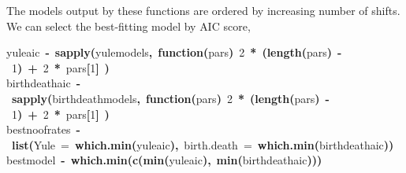 \documentclass[authoryear, preprint]{elsarticle}
\makeatletter
\newcommand{\hlnumber}[1]{\textcolor[rgb]{0,0,0}{#1}}%
\newcommand{\hlfunctioncall}[1]{\textcolor[rgb]{.5,0,.33}{\textbf{#1}}}%
\newcommand{\hlkeyword}[1]{\textbf{#1}}%
\newcommand{\hlargument}[1]{\textcolor[rgb]{.69,.25,.02}{#1}}%
\newcommand{\hlformalargs}[1]{\hlargument{#1}}%
\newcommand{\hlassignement}[1]{\textbf{#1}}%
\newcommand{\hlsymbol}[1]{#1}%
\newcommand{\hlstd}[1]{\textcolor[rgb]{0,0,0}{#1}}%
\newenvironment{kframe}{%
 \def\FrameCommand##1{\hskip\@totalleftmargin \hskip-\fboxsep
 \colorbox{shadecolor}{##1}\hskip-\fboxsep
     \hskip-\linewidth \hskip-\@totalleftmargin \hskip\columnwidth}%
 \MakeFramed {\advance\hsize-\width
   \@totalleftmargin\z@ \linewidth\hsize
   \@setminipage}}%
 {\par\unskip\endMakeFramed}
\newenvironment{knitrout}{}{} %
\makeatother
\begin{document}
The models output by these functions are ordered by increasing number of shifts.  
We can select the best-fitting model by AIC score,
\begin{knitrout}
\color{fgcolor}\begin{kframe}
\begin{flushleft}
\ttfamily\noindent
\hlsymbol{yule\usebox{\hlnormalsizeboxunderscore}aic}{\ }\hlassignement{\usebox{\hlnormalsizeboxlessthan}-}{\ }\hlfunctioncall{sapply}\hlkeyword{(}\hlsymbol{yule\usebox{\hlnormalsizeboxunderscore}models}\hlkeyword{,}{\ }\hlkeyword{function}\hlkeyword{(}\hlformalargs{pars}\hlkeyword{)}{\ }\hlnumber{2}{\ }\hlkeyword{*}{\ }\hlkeyword{(}\hlfunctioncall{length}\hlkeyword{(}\hlsymbol{pars}\hlkeyword{)}{\ }\hlkeyword{-}{\ }\hlnumber{1}\hlkeyword{)}{\ }\hlkeyword{+}{\ }\hlnumber{2}{\ }\hlkeyword{*}{\ }\hlsymbol{pars}\hlkeyword{[}\hlnumber{1}\hlkeyword{]}{\ }\hlkeyword{)}\hspace*{\fill}\\
\hlstd{}\hlsymbol{birth\usebox{\hlnormalsizeboxunderscore}death\usebox{\hlnormalsizeboxunderscore}aic}{\ }\hlassignement{\usebox{\hlnormalsizeboxlessthan}-}{\ }\hlfunctioncall{sapply}\hlkeyword{(}\hlsymbol{birth\usebox{\hlnormalsizeboxunderscore}death\usebox{\hlnormalsizeboxunderscore}models}\hlkeyword{,}{\ }\hlkeyword{function}\hlkeyword{(}\hlformalargs{pars}\hlkeyword{)}{\ }\hlnumber{2}{\ }\hlkeyword{*}{\ }\hlkeyword{(}\hlfunctioncall{length}\hlkeyword{(}\hlsymbol{pars}\hlkeyword{)}{\ }\hlkeyword{-}{\ }\hlnumber{1}\hlkeyword{)}{\ }\hlkeyword{+}{\ }\hlnumber{2}{\ }\hlkeyword{*}{\ }\hlsymbol{pars}\hlkeyword{[}\hlnumber{1}\hlkeyword{]}{\ }\hlkeyword{)}\hspace*{\fill}\\
\hlstd{}\hlsymbol{best\usebox{\hlnormalsizeboxunderscore}no\usebox{\hlnormalsizeboxunderscore}of\usebox{\hlnormalsizeboxunderscore}rates}{\ }\hlassignement{\usebox{\hlnormalsizeboxlessthan}-}{\ }\hlfunctioncall{list}\hlkeyword{(}\hlargument{Yule}{\ }\hlargument{=}{\ }\hlfunctioncall{which.min}\hlkeyword{(}\hlsymbol{yule\usebox{\hlnormalsizeboxunderscore}aic}\hlkeyword{)}\hlkeyword{,}{\ }\hlargument{birth.death}{\ }\hlargument{=}{\ }\hlfunctioncall{which.min}\hlkeyword{(}\hlsymbol{birth\usebox{\hlnormalsizeboxunderscore}death\usebox{\hlnormalsizeboxunderscore}aic}\hlkeyword{)}\hlkeyword{)}\hspace*{\fill}\\
\hlstd{}\hlsymbol{best\usebox{\hlnormalsizeboxunderscore}model}{\ }\hlassignement{\usebox{\hlnormalsizeboxlessthan}-}{\ }\hlfunctioncall{which.min}\hlkeyword{(}\hlfunctioncall{c}\hlkeyword{(}\hlfunctioncall{min}\hlkeyword{(}\hlsymbol{yule\usebox{\hlnormalsizeboxunderscore}aic}\hlkeyword{)}\hlkeyword{,}{\ }\hlfunctioncall{min}\hlkeyword{(}\hlsymbol{birth\usebox{\hlnormalsizeboxunderscore}death\usebox{\hlnormalsizeboxunderscore}aic}\hlkeyword{)}\hlkeyword{)}\hlkeyword{)}\mbox{}
\normalfont
\end{flushleft}
\end{kframe}
\end{knitrout}
\end{document}
